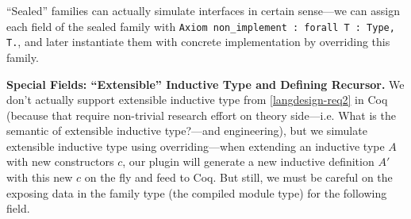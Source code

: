 ``Sealed'' families can actually simulate interfaces in certain sense---we can assign each field of the sealed family with \texttt{Axiom non_implement : forall {T : Type}, T.}, and later instantiate them with concrete implementation by overriding this family.



\textbf{Special Fields: ``Extensible'' Inductive Type and Defining Recursor.}
We don't actually support extensible inductive type from \ref{langdesign-req2} in Coq (because that require non-trivial research effort on theory side---i.e. {What is the semantic of extensible inductive type?}---and engineering), but we simulate extensible inductive type using overriding---when extending an inductive type $A$ with new constructors $c$, our plugin will generate a new inductive definition $A'$ with this new $c$ on the fly and feed to Coq.  But still, we must be careful on the exposing data in the family type (the compiled module type) for the following field.  

